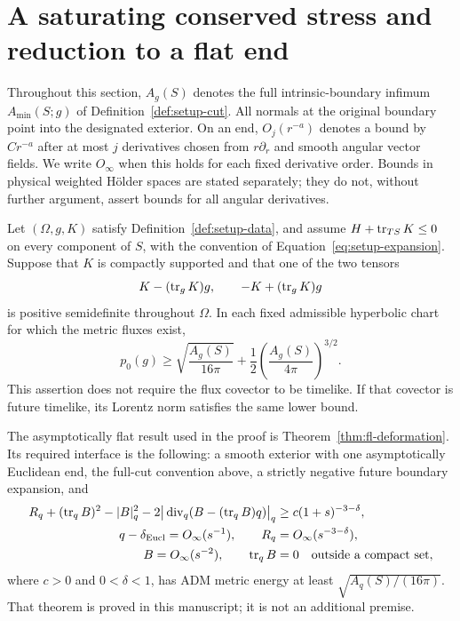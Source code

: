 \section{A saturating conserved stress and reduction to a flat end}
\label{sec:str-reduction}

Throughout this section, $A_g(S)$ denotes the full intrinsic-boundary
infimum $A_{\min}(S;g)$ of Definition~\ref{def:setup-cut}. All normals at
the original boundary point into the designated exterior. On an end,
$O_j(r^{-a})$ denotes a bound by $Cr^{-a}$ after at most $j$ derivatives
chosen from $r\partial_r$ and smooth angular vector fields. We write
$O_\infty$ when this holds for each fixed derivative order. Bounds in
physical weighted H\"older spaces are stated separately; they do not,
without further argument, assert bounds for all angular derivatives.

\begin{theorem}
\label{thm:str-one-sign}
Let $(\Omega,g,K)$ satisfy Definition~\ref{def:setup-data}, and assume
$H+\operatorname{tr}_{TS}K\le0$ on every component of $S$, with the convention of
Equation~\eqref{eq:setup-expansion}. Suppose that $K$
is compactly supported and that one of the two tensors
\[
 K-(\operatorname{tr}_gK)g,\qquad -K+(\operatorname{tr}_gK)g
\]
is positive semidefinite throughout $\Omega$. In each fixed admissible
hyperbolic chart for which the metric fluxes exist,
\begin{equation}
 p_0(g)\geq \sqrt{\frac{A_g(S)}{16\pi}}
       +\frac12\left(\frac{A_g(S)}{4\pi}\right)^{3/2}.
 \label{eq:str-component-bound}
\end{equation}
This assertion does not require the flux covector to be timelike.
If that covector is future timelike, its Lorentz norm satisfies the
same lower bound.
\end{theorem}

The asymptotically flat result used in the proof is
Theorem~\ref{thm:fl-deformation}. Its required interface is the following:
a smooth exterior with one asymptotically Euclidean end, the full-cut
convention above, a strictly negative future boundary expansion, and
\begin{equation}
 \begin{split}
 R_q+(\operatorname{tr}_q B)^2-|B|_q^2
 -2\big|\operatorname{div}_q(B-(\operatorname{tr}_qB)q)\big|_q
     &\geq c(1+s)^{-3-\delta},\\
 q-\delta_{\mathrm{Eucl}}=O_\infty(s^{-1}),\qquad
 R_q&=O_\infty(s^{-3-\delta}),\\
 B=O_\infty(s^{-2}),\qquad \operatorname{tr}_qB&=0
 \quad\hbox{outside a compact set},
 \end{split}
 \label{eq:str-flat-interface}
\end{equation}
where $c>0$ and $0<\delta<1$, has ADM metric energy at least
$\sqrt{A_q(S)/(16\pi)}$. That theorem is proved in this manuscript; it
is not an additional premise.

